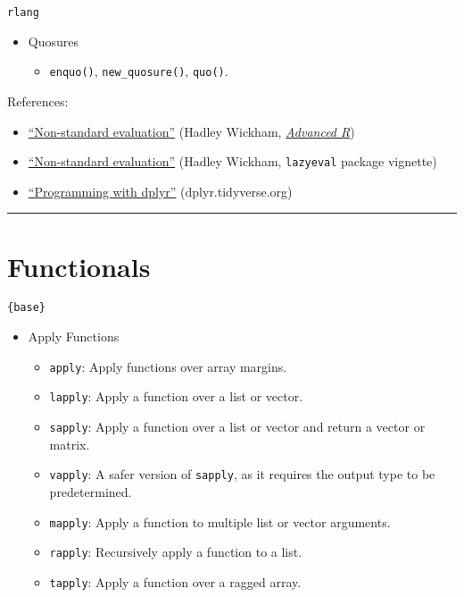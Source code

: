 \documentclass[
]{book}
\providecommand{\tightlist}{%
  \setlength{\itemsep}{0pt}\setlength{\parskip}{0pt}}
\begin{document}
\texttt{rlang}

\begin{itemize}
\tightlist
\item
  Quosures

  \begin{itemize}
  \tightlist
  \item
    \texttt{enquo()}, \texttt{new\_quosure()}, \texttt{quo()}.
  \end{itemize}
\end{itemize}

References:

\begin{itemize}
\tightlist
\item
  \href{http://adv-r.had.co.nz/Computing-on-the-language.html}{``Non-standard evaluation''} (Hadley Wickham, \href{http://adv-r.had.co.nz/}{\emph{Advanced R}})
\item
  \href{https://cran.r-project.org/web/packages/lazyeval/vignettes/lazyeval.html}{``Non-standard evaluation''} (Hadley Wickham, \texttt{lazyeval} package vignette)
\item
  \href{https://dplyr.tidyverse.org/articles/programming.html}{``Programming with dplyr''} (dplyr.tidyverse.org)
\end{itemize}

\begin{center}\rule{0.5\linewidth}{0.5pt}\end{center}

\hypertarget{functionals}{%
\section{Functionals}\label{functionals}}

\texttt{\{base\}}

\begin{itemize}
\tightlist
\item
  Apply Functions

  \begin{itemize}
  \tightlist
  \item
    \texttt{apply}: Apply functions over array margins.
  \item
    \texttt{lapply}: Apply a function over a list or vector.
  \item
    \texttt{sapply}: Apply a function over a list or vector and return a vector or matrix.
  \item
    \texttt{vapply}: A safer version of \texttt{sapply}, as it requires the output type to be predetermined.
  \item
    \texttt{mapply}: Apply a function to multiple list or vector arguments.
  \item
    \texttt{rapply}: Recursively apply a function to a list.
  \item
    \texttt{tapply}: Apply a function over a ragged array.
  \end{itemize}
\end{itemize}
\end{document}
